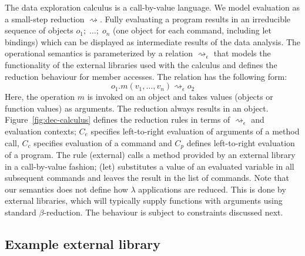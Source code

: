 \documentclass[english,crc]{programming}
\theoremstyle{plain}
\theoremstyle{definition}
\newcommand{\rname}[1]{{\sffamily(#1)}}
\begin{document}
The data exploration calculus is a call-by-value language. We model evaluation as a small-step
reduction $\rightsquigarrow$. Fully evaluating a program results in an irreducible sequence of
objects $o_1;\; \ldots;\; o_n$ (one object for each command, including let bindings) which can be
displayed as intermediate results of the data analysis. The operational semantics is parameterized
by a relation $\rightsquigarrow_\epsilon$ that models the functionality of the external libraries
used with the calculus and defines the reduction behaviour for member accesses. The relation has the
following form:
%
\begin{equation*}
o_1.m(v_1, \ldots, v_n) \rightsquigarrow_\epsilon o_2
\end{equation*}
%
Here, the operation $m$ is invoked on an object and takes values (objects or function values) as arguments.
The reduction always results in an object.
Figure~\ref{fig:dec-calculus} defines the reduction rules in terms of $\rightsquigarrow_\epsilon$
and evaluation contexts; $C_e$ specifies left-to-right evaluation of arguments of a method call,
$C_c$ specifies evaluation of a command and $C_p$ defines left-to-right evaluation of a program.
The rule \rname{external} calls a method provided by an external library in a
call-by-value fashion; \rname{let} substitutes a value of an evaluated variable in
all subsequent commands and leaves the result in the list of commands.
Note that our semantics does not define how $\lambda$ applications are reduced. This is done by
external libraries, which will typically supply functions with arguments using standard $\beta$-reduction.
The behaviour is subject to constraints discussed next.

\subsection{Example external library}
\label{sec:calculus-example}
\end{document}
